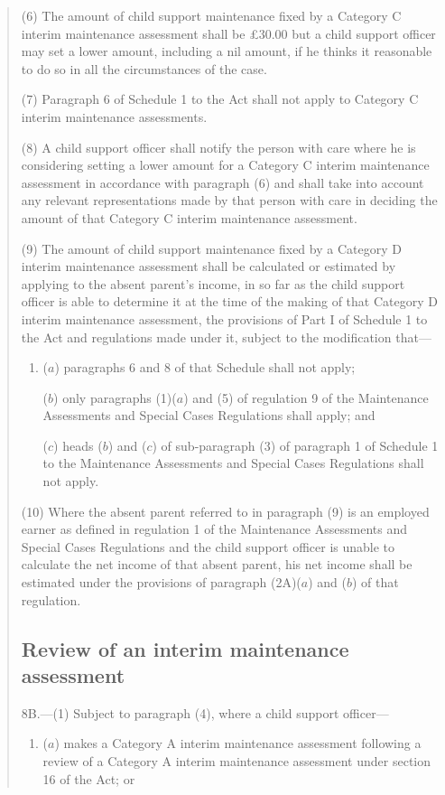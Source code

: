 \documentclass[a4paper]{article}
\begin{document}
\begin{quotation}
(6) The amount of child support maintenance fixed by a Category C interim maintenance assessment shall be £30.00 but a child support officer may set a lower amount, including a nil amount, if he thinks it reasonable to do so in all the circumstances of the case.

(7) Paragraph 6 of Schedule 1 to the Act shall not apply to Category C interim maintenance assessments.

(8) A child support officer shall notify the person with care where he is considering setting a lower amount for a Category C interim maintenance assessment in accordance with paragraph (6) and shall take into account any relevant representations made by that person with care in deciding the amount of that Category C interim maintenance assessment.

(9) The amount of child support maintenance fixed by a Category D interim maintenance assessment shall be calculated or estimated by applying to the absent parent’s income, in so far as the child support officer is able to determine it at the time of the making of that Category D interim maintenance assessment, the provisions of Part I of Schedule 1 to the Act and regulations made under it, subject to the modification that—
\begin{enumerate}\item[]
($a$) paragraphs 6 and 8 of that Schedule shall not apply;

($b$) only paragraphs (1)($a$) and (5) of regulation 9 of the Maintenance Assessments and Special Cases Regulations shall apply; and

($c$) heads ($b$) and ($c$) of sub-paragraph (3) of paragraph 1 of Schedule 1 to the Maintenance Assessments and Special Cases Regulations shall not apply.
\end{enumerate}

(10) Where the absent parent referred to in paragraph (9) is an employed earner as defined in regulation 1 of the Maintenance Assessments and Special Cases Regulations and the child support officer is unable to calculate the net income of that absent parent, his net income shall be estimated under the provisions of paragraph (2A)($a$) and ($b$) of that regulation.

\subsection*{Review of an interim maintenance assessment}

8B.—(1) Subject to paragraph (4), where a child support officer—
\begin{enumerate}\item[]
($a$) makes a Category A interim maintenance assessment following a review of a Category A interim maintenance assessment under section 16 of the Act; or


\end{enumerate}
\end{quotation}
\end{document}
